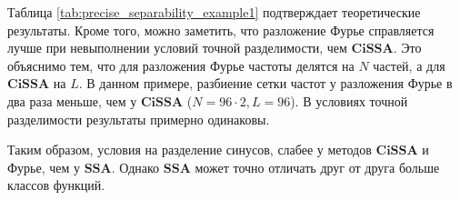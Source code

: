 \documentclass[a4paper, 11pt]{article}
\newcommand{\SSA}{\textbf{SSA}}
\newcommand{\CISSA}{\textbf{CiSSA}}
\newcommand{\TS}{\mathsf{X}}
\begin{document}
Таблица \ref{tab:precise_separability_example1} подтверждает теоретические результаты. Кроме того, можно заметить, что разложение Фурье справляется лучше при невыполнении условий точной разделимости, чем $\CISSA$. Это объяснимо тем, что для разложения Фурье частоты делятся на $N$ частей, а для $\CISSA$ на $L$. В данном примере, разбиение сетки частот у разложения Фурье в два раза меньше, чем у $\CISSA$ ($N = 96 \cdot 2, L = 96$). В условиях точной разделимости результаты примерно одинаковы.

Таким образом, условия на разделение синусов, слабее у методов $\CISSA$ и Фурье, чем у $\SSA$. Однако $\SSA$ может точно отличать друг от друга больше классов функций.





%		
%
%		
\end{document}
